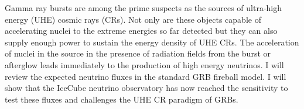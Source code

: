 


\bigskip



\bigskip

\noindent Gamma ray bursts are among the prime suspects as the sources of ultra-high energy (UHE) cosmic rays (CRs). Not only are these objects capable of accelerating nuclei to the extreme energies so far detected but they can also supply enough power to sustain the energy density of UHE CRs. The acceleration of nuclei in the source in the presence of radiation fields from the burst or afterglow leads immediately to the production of high energy neutrinos. I will review the expected neutrino fluxes in the standard GRB fireball model. I will show that the IceCube neutrino observatory has now reached the sensitivity to test these fluxes and challenges the UHE CR paradigm of GRBs.

